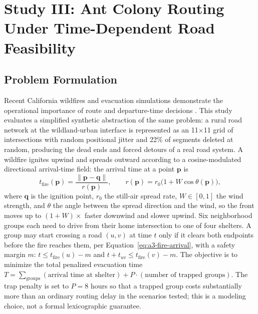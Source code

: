 \documentclass{ai-lab-report}
\begin{document}
\section{Study III: Ant Colony Routing Under Time-Dependent Road Feasibility}

\subsection{Problem Formulation}
Recent California wildfires and evacuation simulations demonstrate the operational importance of route and departure-time decisions \citep{ap2026palisadeseaton,wong2021berkeley}. This study evaluates a simplified synthetic abstraction of the same problem: a rural road network at the wildland-urban interface is represented as an 11$\times$11 grid of intersections with random positional jitter and 22\% of segments deleted at random, producing the dead ends and forced detours of a real road system. A wildfire ignites upwind and spreads outward according to a cosine-modulated directional arrival-time field: the arrival time at a point $\mathbf{p}$ is
\begin{equation}
t_{\text{fire}}(\mathbf{p}) = \frac{\lVert \mathbf{p}-\mathbf{q}\rVert}{r(\mathbf{p})}, \qquad r(\mathbf{p}) = r_0\big(1 + W\cos\theta(\mathbf{p})\big),
\label{eq:a3-fire-arrival}
\end{equation}
where $\mathbf{q}$ is the ignition point, $r_0$ the still-air spread rate, $W\in[0,1]$ the wind strength, and $\theta$ the angle between the spread direction and the wind, so the front moves up to $(1+W)\times$ faster downwind and slower upwind. Six neighborhood groups each need to drive from their home intersection to one of four shelters. A group may start crossing a road $(u,v)$ at time $t$ only if it clears both endpoints before the fire reaches them, per Equation~\eqref{eq:a3-fire-arrival}, with a safety margin $m$: $t \le t_{\text{fire}}(u)-m$ and $t+t_{uv}\le t_{\text{fire}}(v)-m$. The objective is to minimize the total penalized evacuation time $T = \sum_{\text{groups}}(\text{arrival time at shelter}) + P\cdot(\text{number of trapped groups})$. The trap penalty is set to $P=8$ hours so that a trapped group costs substantially more than an ordinary routing delay in the scenarios tested; this is a modeling choice, not a formal lexicographic guarantee.
\end{document}
